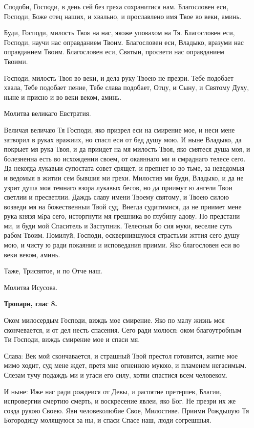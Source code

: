 Сподоби, Господи, в день сей без греха сохранитися нам. Благословен еси, Господи, Боже отец наших, и хвально, и прославлено имя Твое во веки, аминь.

Буди, Господи, милость Твоя на нас, якоже уповахом на Тя. Благословен еси, Господи, научи нас оправданием Твоим. Благословен еси, Владыко, вразуми нас оправданием Твоим. Благословен еси, Святыи, просвети нас оправданием Твоими.

Господи, милость Твоя во веки, и дела  руку Твоею не презри. Тебе подобает хвала, Тебе подобает пение, Тебе слава подобает, Отцу, и Сыну, и Святому Духу, ныне и присно и во веки веком, аминь.


Молитва великаго Евстратия.

Величая величаю Тя Господи, яко призрел еси на смирение мое, и неси мене затворил в руках вражиих, но спасл еси от бед душу мою. И ныне Владыко, да покрыет мя рука Твоя, и да приидет на мя милость Твоя, яко смятеся душа моя, и болезненна есть во исхождении своем, от окаяннаго ми и смраднаго телесе сего. Да некогда лукавыи супостата совет срящет, и препнет ю во тьме, за неведомыя и ведомыя в житии сем бывшия ми грехи. Милостив ми буди, Владыко, и да не узрит душа моя темнаго взора лукавых бесов, но да приимут ю ангели Твои светлии  и пресветлии. Даждь славу имени Твоему святому, и Твоею силою возведи мя на божественныи Твой суд. Внегда судитимися, да не приимет мене рука князя мiра сего, исторгнути мя грешника во глубину адову. Но предстани ми, и буди мой Спаситель и Заступник. Телесныя бо сия муки, веселие суть рабом Твоим. Помилуй, Господи, осквернившуюся страстьми жттия сего душу мою, и чисту ю ради покаяния и исповедания приими. Яко благословен еси во веки веком, аминь.


Таже, Трисвятое, и по Отче наш.

Молитва Исусова.


\medskip


\bfseries Тропари, глас 8.\normalfont{}\nopagebreak


Оком милосердым Господи, виждь мое смирение. Яко по малу жизнь моя скончевается, и от дел несть спасения. Сего ради молюся: оком благоутробным Ти Господи, виждь смирение мое и спаси мя.

Слава: Век мой скончавается, и страшный Твой престол готовится, житие мое мимо ходит, суд мене ждет, претя мне огненною мукою, и пламенем негасимым. Слезам тучу подаждь ми и угаси его силу, хотяи спастися всем человеком.

И ныне: Иже нас ради рождеися от Девы, и распятие претерпев, Благии, испровергии смертию смерть, и воскресение явлеи, яко Бог. Не презри их же созда рукою Своею. Яви человеколюбие Свое, Милостиве. Приими Рождьшую Тя Богородицу молящуюся за ны, и спаси Спасе наш, люди согрешшыя.

